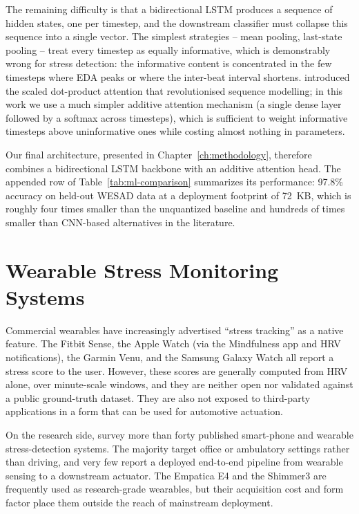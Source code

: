 The remaining difficulty is that a bidirectional LSTM produces a
sequence of hidden states, one per timestep, and the downstream
classifier must collapse this sequence into a single vector. The
simplest strategies -- mean pooling, last-state pooling -- treat every
timestep as equally informative, which is demonstrably wrong for
stress detection: the informative content is concentrated in the
few timesteps where EDA peaks or where the inter-beat interval
shortens. \citet{vaswani2017attention} introduced the scaled
dot-product attention that revolutionised sequence modelling; in
this work we use a much simpler additive attention mechanism (a
single dense layer followed by a softmax across timesteps), which
is sufficient to weight informative timesteps above uninformative
ones while costing almost nothing in parameters.

Our final architecture, presented in Chapter~\ref{ch:methodology},
therefore combines a bidirectional LSTM backbone with an additive
attention head. The appended row of Table~\ref{tab:ml-comparison}
summarizes its performance: 97.8\% accuracy on held-out WESAD data
at a deployment footprint of 72~KB, which is roughly four times
smaller than the unquantized baseline and hundreds of times smaller
than CNN-based alternatives in the literature.

\section{Wearable Stress Monitoring Systems}
\label{sec:lit-wearables}

Commercial wearables have increasingly advertised ``stress tracking''
as a native feature. The Fitbit Sense, the Apple Watch (via the
Mindfulness app and HRV notifications), the Garmin Venu, and the
Samsung Galaxy Watch all report a stress score to the user. However,
these scores are generally computed from HRV alone, over minute-scale
windows, and they are neither open nor validated against a public
ground-truth dataset. They are also not exposed to third-party
applications in a form that can be used for automotive actuation.

On the research side, \citet{can2019stress} survey more than forty
published smart-phone and wearable stress-detection systems. The majority target office or
ambulatory settings rather than driving, and very few report a
deployed end-to-end pipeline from wearable sensing to a downstream
actuator. The Empatica E4 and the Shimmer3 are frequently used as
research-grade wearables, but their acquisition cost and form factor
place them outside the reach of mainstream deployment.

